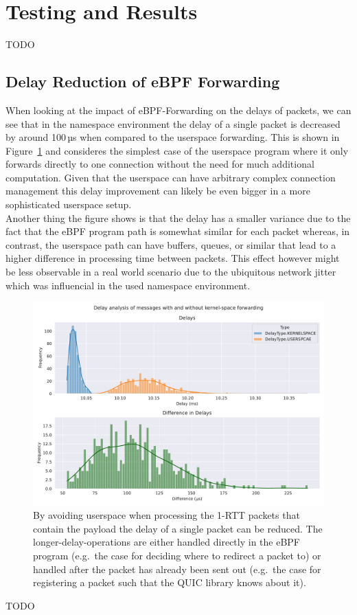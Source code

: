 \section{Testing and Results}\label{sec:testing_and_results}
TODO
\subsection{Delay Reduction of eBPF Forwarding}
When looking at the impact of eBPF-Forwarding on the delays of packets, we can see that
in the namespace environment the delay of a single packet is decreased by around 100\,µs
when compared to the userspace forwarding. This is shown in Figure~\ref{fig:delay-improvement} and 
consideres the simplest case of the userspace program where it only forwards directly to one connection
without the need for much additional computation. Given that the userspace can have arbitrary complex 
connection management this delay improvement can likely be even bigger in a more sophisticated userspace
setup.
\\
Another thing the figure shows is that the delay has a smaller variance due to the fact that the eBPF program
path is somewhat similar for each packet whereas, in contrast, the userspace path can have buffers, queues, 
or similar that lead to a higher difference in processing time between packets. 
This effect however might be less observable in a real world scenario due to the ubiquitous network jitter which 
was influencial in the used namespace environment.
\begin{figure}[htbp]
    \centering
    \includegraphics[width=\textwidth]{figures/04_testing_and_results/delays_small_packets_simple_userspace.pdf}
    \caption[Delay analysis of eBPF approach]{By avoiding userspace when processing the 1-RTT packets that contain the payload
    the delay of a single packet can be reduced. The longer-delay-operations are either handled
    directly in the eBPF program (e.g.~the case for deciding where to redirect a packet to) or 
    handled after the packet has already been sent out (e.g.~the case for registering a packet 
    such that the QUIC library knows about it).}\label{fig:delay-improvement}
\end{figure}
TODO

